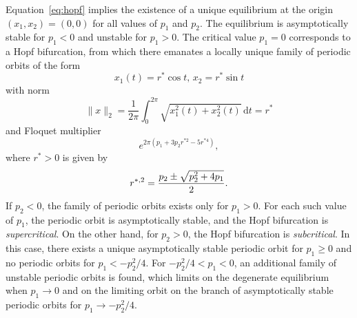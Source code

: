 Equation~\eqref{eq:hopf} implies the existence of a unique equilibrium at the origin $(x_1,x_2)=(0,0)$ for all values of $p_1$ and $p_2$. The equilibrium is asymptotically stable for $p_1<0$ and unstable for $p_1>0$. The critical value $p_1=0$ corresponds to a Hopf bifurcation, from which there emanates a locally unique family of periodic orbits of the form
\begin{equation}
x_1(t)=r^\ast\cos t,\,x_2=r^\ast\sin t
\end{equation}
with norm
\begin{equation}
\|x\|_2 = \frac{1}{2\pi}\int_0^{2\pi}\sqrt{x_1^2(t)+x_2^2(t)}\,\mathrm{d}t=r^\ast
\end{equation}
and Floquet multiplier
\begin{equation}
e^{2\pi(p_1+3p_2r^{\ast2}-5r^{\ast4})},
\end{equation}
where $r^\ast>0$ is given by
\begin{equation}
r^{\ast,2}=\frac{p_2\pm\\\sqrt{p_2^2+4p_1}}{2}.
\end{equation}
If $p_2<0$, the family of periodic orbits exists only for $p_1>0$. For each such value of $p_1$, the periodic orbit is asymptotically stable, and the Hopf bifurcation is \emph{supercritical}. On the other hand, for $p_2>0$, the Hopf bifurcation is \emph{subcritical}. In this case, there exists a unique asymptotically stable periodic orbit for $p_1\ge0$ and no periodic orbits for $p_1<-p_2^2/4$. For $-p^2_2/4< p_1<0$, an additional family of unstable periodic orbits is found, which limits on the degenerate equilibrium when $p_1\rightarrow0$ and on the limiting orbit on the branch of asymptotically stable periodic orbits for $p_1\rightarrow-p^2_2/4$.

